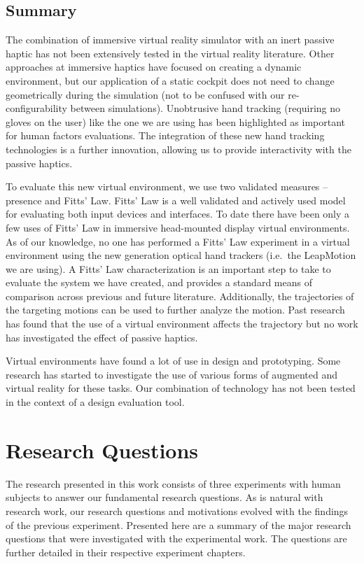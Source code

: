 \subsection{Summary}
\label{summary}

The combination of immersive virtual reality simulator with an inert passive haptic has not been extensively tested in the virtual reality literature.
Other approaches at immersive haptics have focused on creating a dynamic environment, but our application of a static cockpit does not need to change geometrically during the simulation (not to be confused with our re-configurability between simulations).
Unobtrusive hand tracking (requiring no gloves on the user) like the one we are using has been highlighted as important for human factors evaluations.
The integration of these new hand tracking technologies is a further innovation, allowing us to provide interactivity with the passive haptics.

To evaluate this new virtual environment, we use two validated measures -- presence and Fitts' Law.
Fitts' Law is a well validated and actively used model for evaluating both input devices and interfaces.
To date there have been only a few uses of Fitts' Law in immersive head-mounted display virtual environments.
As of our knowledge, no one has performed a Fitts' Law experiment in a virtual environment using the new generation optical hand trackers (i.e.\ the LeapMotion we are using).
A Fitts' Law characterization is an important step to take to evaluate the system we have created, and provides a standard means of comparison across previous and future literature.
Additionally, the trajectories of the targeting motions can be used to further analyze the motion.
Past research has found that the use of a virtual environment affects the trajectory but no work has investigated the effect of passive haptics.

Virtual environments have found a lot of use in design and prototyping.
Some research has started to investigate the use of various forms of augmented and virtual reality for these tasks.
Our combination of technology has not been tested in the context of a design evaluation tool.

\section{Research Questions}
\label{hypotheses}

The research presented in this work consists of three experiments with human subjects to answer our fundamental research questions.
As is natural with research work, our research questions and motivations evolved with the findings of the previous experiment.
Presented here are a summary of the major research questions that were investigated with the experimental work.
The questions are further detailed in their respective experiment chapters.

